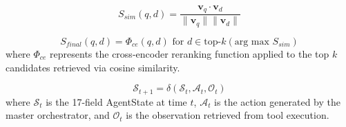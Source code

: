 
\begin{equation} \label{eq:rag_sim}
S_{sim}(q, d) = \frac{\mathbf{v}_q \cdot \mathbf{v}_d}{\|\mathbf{v}_q\| \|\mathbf{v}_d\|}
\end{equation}

\begin{equation} \label{eq:rag_final}
S_{final}(q, d) = \Phi_{ce}(q, d) \text{ for } d \in \text{top-}k(\text{arg max } S_{sim})
\end{equation}
where $\Phi_{ce}$ represents the cross-encoder reranking function applied to the top $k$ candidates retrieved via cosine similarity.


\begin{equation} \label{eq:state_transition}
\mathcal{S}_{t+1} = \delta(\mathcal{S}_t, \mathcal{A}_t, \mathcal{O}_t)
\end{equation}
where $\mathcal{S}_t$ is the 17-field AgentState at time $t$, $\mathcal{A}_t$ is the action generated by the master orchestrator, and $\mathcal{O}_t$ is the observation retrieved from tool execution.
